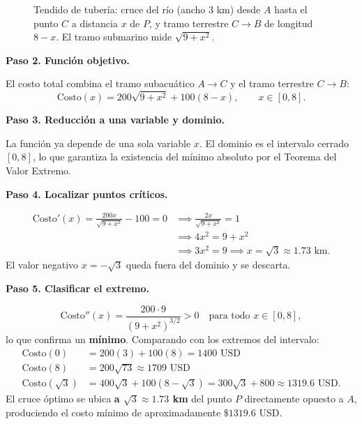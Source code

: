\begin{example}
\begin{myproof}
\begin{figure}[H]
\caption{Tendido de tubería: cruce del río (ancho $3$ km) desde $A$ hasta el
  punto $C$ a distancia $x$ de $P$, y tramo terrestre $C\to B$ de longitud
  $8-x$. El tramo submarino mide $\sqrt{9+x^2}$.}
\label{fig:tuberia_rio}
\end{figure}

\textbf{Paso 2. Función objetivo.}

El costo total combina el tramo subacuático $A\to C$ y el tramo
terrestre $C\to B$:
\[
\text{Costo}(x)
= 200\sqrt{9+x^2} + 100(8-x), \qquad x\in[0,8].
\]

\textbf{Paso 3. Reducción a una variable y dominio.}

La función ya depende de una sola variable $x$. El dominio es el
intervalo cerrado $[0,8]$, lo que garantiza la existencia del mínimo
absoluto por el Teorema del Valor Extremo.

\textbf{Paso 4. Localizar puntos críticos.}

\begin{align*}
\text{Costo}'(x)
= \frac{200x}{\sqrt{9+x^2}} - 100 = 0
&\implies \frac{2x}{\sqrt{9+x^2}} = 1\\
&\implies 4x^2 = 9+x^2\\
&\implies 3x^2 = 9
\implies x = \sqrt{3} \approx 1.73 \text{ km}.
\end{align*}
El valor negativo $x=-\sqrt{3}$ queda fuera del dominio y se descarta.

\textbf{Paso 5. Clasificar el extremo.}

\[
\text{Costo}''(x)
= \frac{200\cdot 9}{(9+x^2)^{3/2}} > 0
\quad \text{para todo } x\in[0,8],
\]
lo que confirma un \textbf{mínimo}. Comparando con los extremos del
intervalo:
\begin{align*}
\text{Costo}(0)      &= 200(3)+100(8) = 1400 \text{ USD}\\
\text{Costo}(8)      &= 200\sqrt{73}  \approx 1709 \text{ USD}\\
\text{Costo}(\sqrt{3}) &= 400\sqrt{3}+100(8-\sqrt{3}) = 300\sqrt{3}+800\approx \boxed{1319.6 \text{ USD}}.
\end{align*}
El cruce óptimo se ubica \textbf{a $\sqrt{3}\approx 1.73$ km} del
punto $P$ directamente opuesto a $A$, produciendo el costo mínimo
de aproximadamente $\$1319.6$ USD.
\end{myproof}
\end{example}
